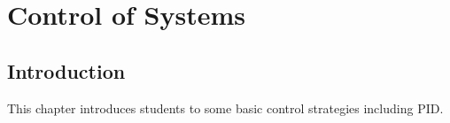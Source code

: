 \chapter{Control of Systems}

\section{Introduction}
This chapter introduces students to some basic control strategies including PID.
